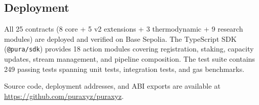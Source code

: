 \subsection{Deployment}

All 25 contracts (8 core + 5 v2 extensions + 3 thermodynamic + 9 research modules)
are deployed and verified on Base Sepolia. The TypeScript SDK (\texttt{@pura/sdk})
provides 18 action modules covering registration, staking, capacity updates, stream
management, and pipeline composition. The test suite contains 249 passing tests
spanning unit tests, integration tests, and gas benchmarks.

Source code, deployment addresses, and ABI exports are available at
\url{https://github.com/puraxyz/puraxyz}.
